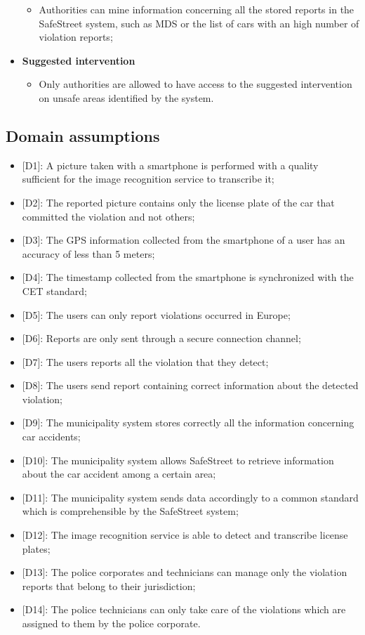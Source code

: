\begin{itemize}
\begin{itemize}
            \item Authorities can mine information concerning all the stored reports in the SafeStreet system, such as MDS or the list of cars with an high number of violation reports;
        \end{itemize}
    \item \textbf{Suggested intervention}
        \begin{itemize}
            \item Only authorities are allowed to have access to the suggested intervention on unsafe areas identified by the system.
        \end{itemize}
    \end{itemize}
\subsection{Domain assumptions}
\begin{itemize}
    \item {[D1]}: A picture taken with a smartphone is performed with a quality sufficient for the image recognition service to transcribe it;
    \item {[D2]}: The reported picture contains only the license plate of the car that committed the violation and not others;
    \item {[D3]}: The GPS information collected from the smartphone of a user has an accuracy of less than 5 meters;
    \item {[D4]}: The timestamp collected from the smartphone is synchronized with the CET standard;
    \item {[D5]}: The users can only report violations occurred in Europe;
    \item {[D6]}: Reports are only sent through a secure connection channel;
    \item {[D7]}: The users reports all the violation that they detect;
    \item {[D8]}: The users send report containing correct information about the detected violation;
    \item {[D9]}: The municipality system stores correctly all the information concerning car accidents;
    \item {[D10]}: The municipality system allows SafeStreet to retrieve information about the car accident among a certain area;
    \item {[D11]}: The municipality system sends data accordingly to a common standard which is comprehensible by the SafeStreet system;
    \item {[D12]}: The image recognition service is able to detect and transcribe license plates;
    \item {[D13]}: The police corporates and technicians can manage only the violation reports that belong to their jurisdiction;
    \item {[D14]}: The police technicians can only take care of the violations which are assigned to them by the police corporate.
\end{itemize}
